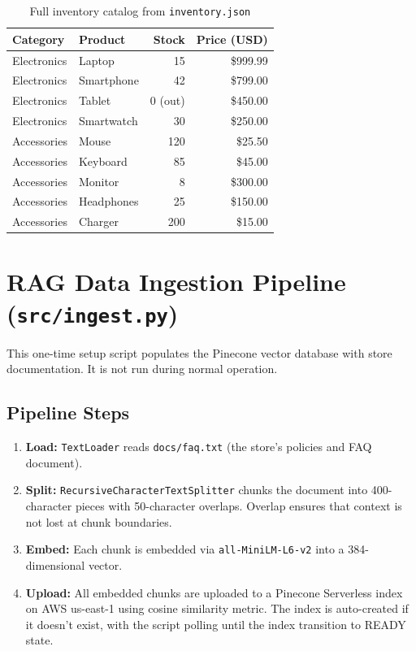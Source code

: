 \documentclass[12pt]{article}
\begin{document}
\begin{table}[h!]
\centering
\begin{tabular}{llrr}
\toprule
\textbf{Category} & \textbf{Product} & \textbf{Stock} & \textbf{Price (USD)} \\
\midrule
Electronics & Laptop & 15 & \$999.99 \\
Electronics & Smartphone & 42 & \$799.00 \\
Electronics & Tablet & 0 (out) & \$450.00 \\
Electronics & Smartwatch & 30 & \$250.00 \\
Accessories & Mouse & 120 & \$25.50 \\
Accessories & Keyboard & 85 & \$45.00 \\
Accessories & Monitor & 8 & \$300.00 \\
Accessories & Headphones & 25 & \$150.00 \\
Accessories & Charger & 200 & \$15.00 \\
\bottomrule
\end{tabular}
\caption{Full inventory catalog from \texttt{inventory.json}}
\end{table}

\section{RAG Data Ingestion Pipeline (\texttt{src/ingest.py})}

This one-time setup script populates the Pinecone vector database with store documentation. It is not run during normal operation.

\subsection{Pipeline Steps}
\begin{enumerate}[leftmargin=1.5em]
    \item \textbf{Load:} \texttt{TextLoader} reads \texttt{docs/faq.txt} (the store's policies and FAQ document).
    \item \textbf{Split:} \texttt{RecursiveCharacterTextSplitter} chunks the document into 400-character pieces with 50-character overlaps. Overlap ensures that context is not lost at chunk boundaries.
    \item \textbf{Embed:} Each chunk is embedded via \texttt{all-MiniLM-L6-v2} into a 384-dimensional vector.
    \item \textbf{Upload:} All embedded chunks are uploaded to a Pinecone Serverless index on AWS us-east-1 using cosine similarity metric. The index is auto-created if it doesn't exist, with the script polling until the index transition to READY state.
\end{enumerate}
\end{document}
